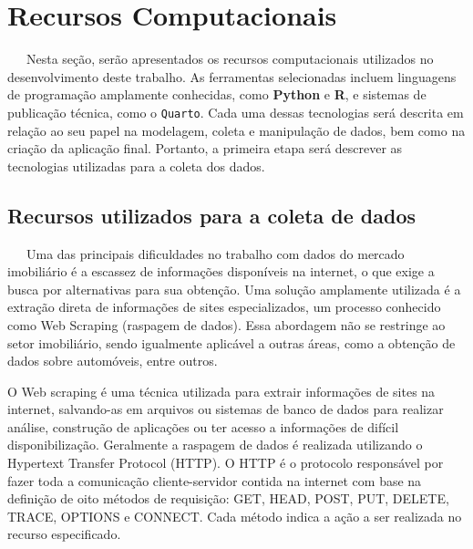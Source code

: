 \documentclass[
  12pt,
  a4paper,
]{scrreprt}
\begin{document}
\chapter{Recursos Computacionais}\label{recursos-computacionais}

~~~Nesta seção, serão apresentados os recursos computacionais utilizados
no desenvolvimento deste trabalho. As ferramentas selecionadas incluem
linguagens de programação amplamente conhecidas, como \textbf{Python} e
\textbf{R}, e sistemas de publicação técnica, como o \texttt{Quarto}.
Cada uma dessas tecnologias será descrita em relação ao seu papel na
modelagem, coleta e manipulação de dados, bem como na criação da
aplicação final. Portanto, a primeira etapa será descrever as
tecnologias utilizadas para a coleta dos dados.

\section{Recursos utilizados para a coleta de
dados}\label{recursos-utilizados-para-a-coleta-de-dados}

~~~Uma das principais dificuldades no trabalho com dados do mercado
imobiliário é a escassez de informações disponíveis na internet, o que
exige a busca por alternativas para sua obtenção. Uma solução amplamente
utilizada é a extração direta de informações de sites especializados, um
processo conhecido como Web Scraping (raspagem de dados). Essa abordagem
não se restringe ao setor imobiliário, sendo igualmente aplicável a
outras áreas, como a obtenção de dados sobre automóveis, entre outros.

\vspace{12pt}

O Web scraping é uma técnica utilizada para extrair informações de sites
na internet, salvando-as em arquivos ou sistemas de banco de dados para
realizar análise, construção de aplicações ou ter acesso a informações
de difícil disponibilização. Geralmente a raspagem de dados é realizada
utilizando o Hypertext Transfer Protocol (HTTP). O HTTP é o protocolo
responsável por fazer toda a comunicação cliente-servidor contida na
internet com base na definição de oito métodos de requisição: GET, HEAD,
POST, PUT, DELETE, TRACE, OPTIONS e CONNECT. Cada método indica a ação a
ser realizada no recurso especificado.
\end{document}
